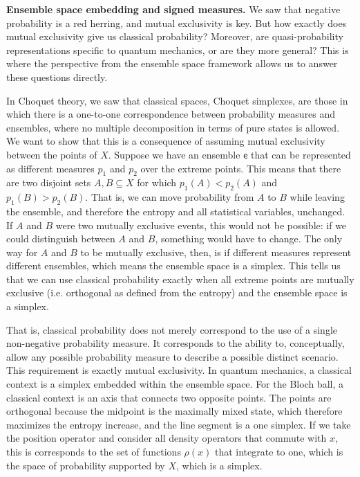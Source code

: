 \documentclass[10pt,twocolumn, nofootinbib]{revtex4-2}
\newcommand{\ens}[1][e] {\mathsf{#1}} %
\begin{document}

\textbf{Ensemble space embedding and signed measures.} We saw that negative probability is a red herring, and mutual exclusivity is key. But how exactly does mutual exclusivity give us classical probability? Moreover, are quasi-probability representations specific to quantum mechanics, or are they more general? This is where the perspective from the ensemble space framework allows us to answer these questions directly.

In Choquet theory, we saw that classical spaces, Choquet simplexes, are those in which there is a one-to-one correspondence between probability measures and ensembles, where no multiple decomposition in terms of pure states is allowed. We want to show that this is a consequence of assuming mutual exclusivity between the points of $X$. Suppose we have an ensemble $\ens$ that can be represented as different measures $p_1$ and $p_2$ over the extreme points. This means that there are two disjoint sets $A, B \subseteq X$ for which $p_1(A) < p_2(A)$ and $p_1(B) > p_2(B)$. That is, we can move probability from $A$ to $B$ while leaving the ensemble, and therefore the entropy and all statistical variables, unchanged. If $A$ and $B$ were two mutually exclusive events, this would not be possible: if we could distinguish between $A$ and $B$, something would have to change. The only way for $A$ and $B$ to be mutually exclusive, then, is if different measures represent different ensembles, which means the ensemble space is a simplex. This tells us that we can use classical probability exactly when all extreme points are mutually exclusive (i.e. orthogonal as defined from the entropy) and the ensemble space is a simplex.

That is, classical probability does not merely correspond to the use of a single non-negative probability measure. It corresponds to the ability to, conceptually, allow any possible probability measure to describe a possible distinct scenario. This requirement is exactly mutual exclusivity. In quantum mechanics, a classical context is a simplex embedded within the ensemble space. For the Bloch ball, a classical context is an axis that connects two opposite points. The points are orthogonal because the midpoint is the maximally mixed state, which therefore maximizes the entropy increase, and the line segment is a one simplex. If we take the position operator and consider all density operators that commute with $x$, this is corresponds to the set of functions $\rho(x)$ that integrate to one, which is the space of probability supported by $X$, which is a simplex.
\end{document}

